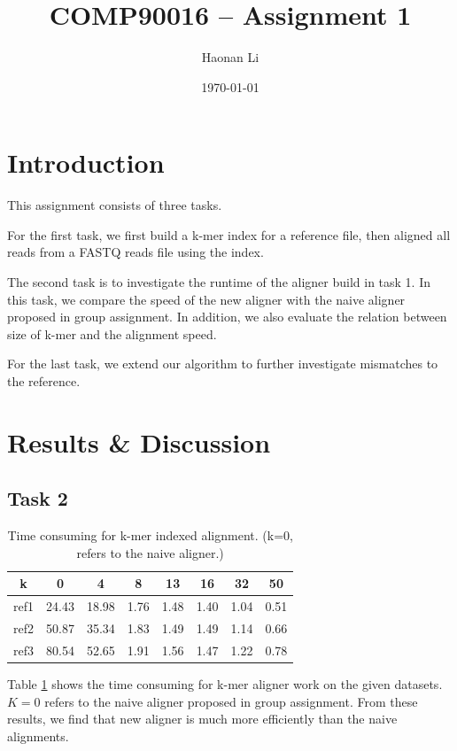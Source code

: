 \documentclass[a4paper]{article}
\title{\bfseries{COMP90016 -- Assignment 1 }}
\author{Haonan Li}
\date{\today}
\begin{document}
\maketitle

\section{Introduction}
\label{sec:introduction}

This assignment consists of three tasks. 

For the first task, we first build a k-mer index for a reference file, then aligned all reads from a FASTQ reads file using the index.

The second task is to investigate the runtime of the aligner build in task 1. In this task, we compare the speed of the new aligner with the naive aligner proposed in group assignment. In addition, we also evaluate the relation between size of k-mer and the alignment speed.

For the last task, we extend our algorithm to further investigate mismatches to the reference.

\section{Results \& Discussion}
\label{sec:experiment}
\subsection{Task 2}

\begin{table}[H]
	\centering
	\begin{tabular}{c|c|c|c|c|c|c|c}
		\hline
		k & 0 & 4 & 8 & 13 & 16 & 32 & 50 \\
		\hline
		ref1 & 24.43 & 18.98 & 1.76 & 1.48 & 1.40 & 1.04 & 0.51 \\
		\hline
		ref2 & 50.87 & 35.34 & 1.83 & 1.49 & 1.49 & 1.14 & 0.66 \\
		\hline
		ref3 & 80.54 & 52.65 & 1.91 & 1.56 & 1.47 & 1.22 & 0.78\\
		\hline
	\end{tabular}
	\caption{\label{tab:1}Time consuming for k-mer indexed alignment. (k=0, refers to  the naive aligner.)}
\end{table}

Table \ref{tab:1} shows the time consuming for k-mer aligner work on the given datasets. $K=0$ refers to the naive aligner proposed in group assignment. From these results, we find that new aligner is much more efficiently than the naive alignments.
\end{document}

